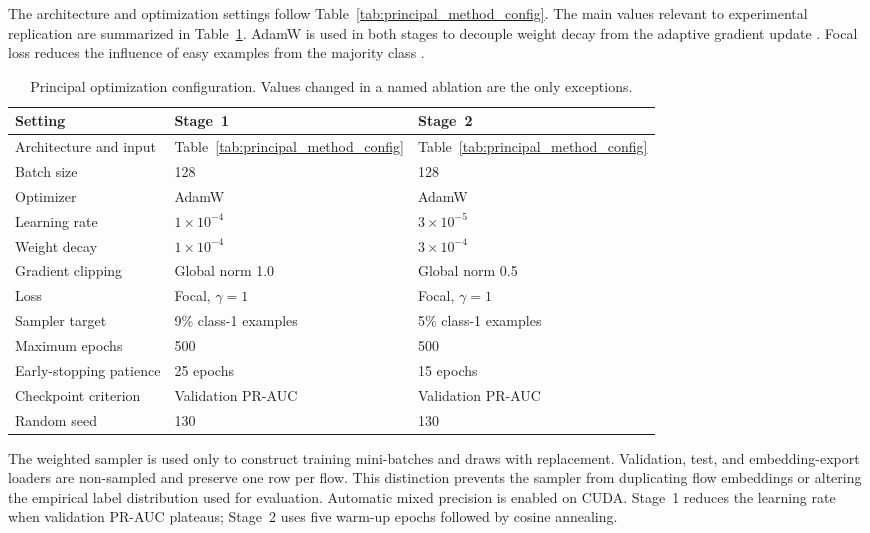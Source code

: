\documentclass[11pt,fleqn]{report}
\begin{document}
The architecture and optimization settings follow
Table~\ref{tab:principal_method_config}. The main values relevant to
experimental replication are summarized in
Table~\ref{tab:experimental_training_config}. AdamW is used in both stages to
decouple weight decay from the adaptive gradient update
\cite{Loshchilov2019AdamW}. Focal loss reduces the influence of easy examples
from the majority class \cite{Lin2017FocalLoss}.

\begin{table}[H]
    \centering
    \caption{Principal optimization configuration. Values changed in a named
    ablation are the only exceptions.}
    \label{tab:experimental_training_config}
    \begin{tabular}{@{}p{3.0cm}p{4.6cm}p{5.7cm}@{}}
        \toprule
        Setting & Stage~1 & Stage~2 \\
        \midrule
        Architecture and input & Table~\ref{tab:principal_method_config} &
        Table~\ref{tab:principal_method_config} \\
        Batch size & 128 & 128 \\
        Optimizer & AdamW & AdamW \\
        Learning rate & $1\times10^{-4}$ & $3\times10^{-5}$ \\
        Weight decay & $1\times10^{-4}$ & $3\times10^{-4}$ \\
        Gradient clipping & Global norm 1.0 & Global norm 0.5 \\
        Loss & Focal, $\gamma=1$ & Focal, $\gamma=1$ \\
        Sampler target & 9\% class-1 examples & 5\% class-1 examples \\
        Maximum epochs & 500 & 500 \\
        Early-stopping patience & 25 epochs & 15 epochs \\
        Checkpoint criterion & Validation PR-AUC & Validation PR-AUC \\
        Random seed & 130 & 130 \\
        \bottomrule
    \end{tabular}
\end{table}

The weighted sampler is used only to construct training mini-batches and draws
with replacement. Validation, test, and embedding-export loaders are
non-sampled and preserve one row per flow. This distinction prevents the
sampler from duplicating flow embeddings or altering the empirical label
distribution used for evaluation. Automatic mixed precision is enabled on
CUDA. Stage~1 reduces the learning rate when validation PR-AUC plateaus;
Stage~2 uses five warm-up epochs followed by cosine annealing.
\end{document}
